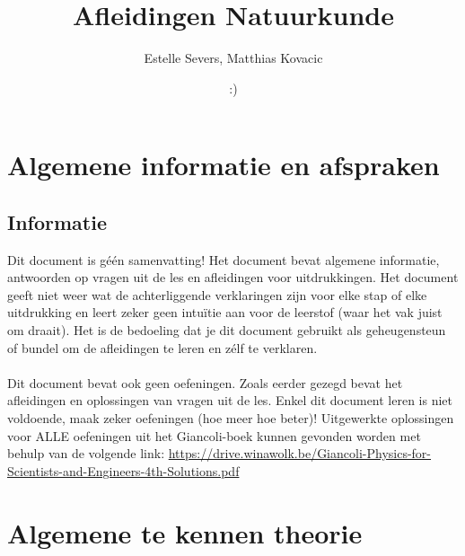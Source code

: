 \documentclass[12pt,a4paper]{article}
\author{Estelle Severs, Matthias Kovacic}
\title{Afleidingen Natuurkunde}
\date{:)}
\begin{document}
    \maketitle
    \tableofcontents
    \newpage


    \section{Algemene informatie en afspraken}
    \subsection{Informatie}
    Dit document is géén samenvatting! Het document bevat algemene informatie, antwoorden
    op vragen uit de les en afleidingen voor uitdrukkingen. Het document geeft niet weer wat de 
    achterliggende verklaringen zijn voor elke stap of elke uitdrukking en leert zeker geen intuïtie
    aan voor de leerstof (waar het vak juist om draait). Het is de bedoeling dat je dit document
    gebruikt als geheugensteun of bundel om de afleidingen te leren en zélf te verklaren. \\
    \\
    Dit document bevat ook geen oefeningen. Zoals eerder gezegd bevat het afleidingen en oplossingen
    van vragen uit de les. Enkel dit document leren is niet voldoende, maak zeker oefeningen (hoe meer
    hoe beter)! Uitgewerkte oplossingen voor ALLE oefeningen uit het Giancoli-boek kunnen gevonden worden met behulp 
    van de volgende link: \url{https://drive.winawolk.be/Giancoli-Physics-for-Scientists-and-Engineers-4th-Solutions.pdf}

    \section{Algemene te kennen theorie}
\end{document}
